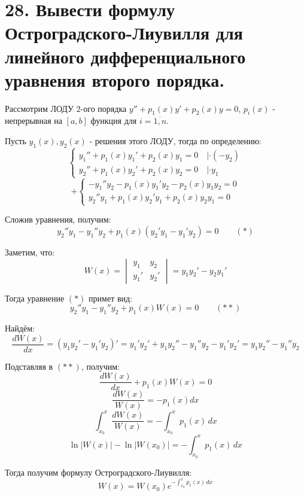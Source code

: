 \documentclass[11pt]{article}
\begin{document}
\section*{28. Вывести формулу Остроградского-Лиувилля для линейного дифференциального уравнения второго порядка.}
\par Рассмотрим ЛОДУ 2-ого порядка $y'' + p_{1}(x)y' + p_{2}(x)y = 0$, $p_{i}(x)$ - непрерывная на $[a, b]$ функция для $i = \overline{1, n}$.
\par Пусть $y_{1}(x), y_{2}(x)$ - решения этого ЛОДУ, тогда по определению:
$$\left\{\begin{array}{l}
y_{1}'' + p_{1}(x)y_{1}' + p_{2}(x)y_{1} = 0 \quad | \cdot (-y_{2})\\
y_{2}'' + p_{1}(x)y_{2}' + p_{2}(x)y_{2} = 0 \quad | \cdot y_{1}
\end{array}\right.$$
$$+\left\{\begin{array}{l}
- y_{1}''y_{2} - p_{1}(x)y_{1}'y_{2} - p_{2}(x)y_{1}y_{2} = 0 \\
y_{2}''y_{1} + p_{1}(x)y_{2}'y_{1} + p_{2}(x)y_{2}y_{1} = 0
\end{array}\right.$$
\par Сложив уравнения, получим:$$y_{2}''y_{1} - y_{1}''y_{2} + p_{1}(x)(y_{2}'y_{1} - y_{1}'y_{2}) = 0 \qquad (*)$$
\par Заметим, что:$$W(x) = \begin{vmatrix}{} y_{1} & y_{2} \\ y_{1}' & y_{2}' \end{vmatrix} = y_{1}y_{2}' - y_{2}y_{1}'$$
\par Тогда уравнение $(*)$ примет вид:$$y_{2}''y_{1} - y_{1}''y_{2} + p_{1}(x)W(x) = 0 \qquad (**)$$
\par Найдём:$$\frac{dW(x)}{dx} = (y_{1}y_{2}' - y_{1}'y_{2})' = y_{1}'y_{2}' + y_{1}y_{2}'' - y_{1}''y_{2} - y_{1}'y_{2}' = y_{1}y_{2}'' - y_{1}''y_{2}$$
\par Подставляя в $(**)$, получим:$$\frac{dW(x)}{dx} + p_{1}(x)W(x) = 0$$
$$\frac{dW(x)}{W(x)} = -p_{1}(x)dx$$
$$\int_{x_{0}}^x \frac{dW(x)}{W(x)} = -\int_{x_{0}}^x p_{1}(x) \, dx$$
$$\ln|W(x)| - \ln|W(x_{0})| = -\int_{x_{0}}^x p_{1}(x) \, dx$$
\par Тогда получим формулу Остроградского-Лиувилля:$$ W(x) = W(x_{0}) e^{-\int_{x_{0}}^x p_{1}(x) \, dx }$$
\end{document}
